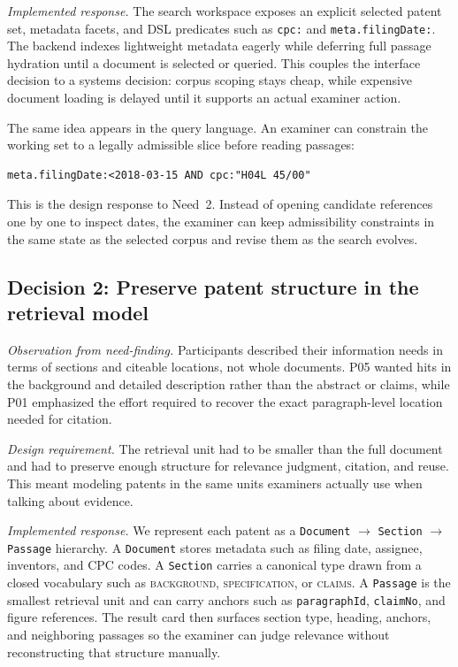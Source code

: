 \documentclass[sigconf]{acmart}
\newcommand{\DocSectionPassage}{\texttt{Document} $\to$ \texttt{Section} $\to$ \texttt{Passage}}
\begin{document}
\emph{Implemented response.} The search workspace exposes an explicit selected
patent set, metadata facets, and DSL predicates such as \texttt{cpc:} and
\texttt{meta.filingDate:}. The backend indexes lightweight metadata eagerly
while deferring full passage hydration until a document is selected or queried.
This couples the interface decision to a systems decision: corpus scoping stays
cheap, while expensive document loading is delayed until it supports an actual
examiner action.

The same idea appears in the query language. An examiner can constrain the
working set to a legally admissible slice before reading passages:

\begin{lstlisting}[caption={Constrain a scoped corpus by filing date and CPC.}]
meta.filingDate:<2018-03-15 AND cpc:"H04L 45/00"
\end{lstlisting}

This is the design response to Need~2. Instead of opening candidate references
one by one to inspect dates, the examiner can keep admissibility constraints in
the same state as the selected corpus and revise them as the search evolves.


\subsection{Decision 2: Preserve patent structure in the retrieval model}

\emph{Observation from need-finding.} Participants described their information
needs in terms of sections and citeable locations, not whole documents. P05
wanted hits in the background and detailed description rather than the abstract
or claims, while P01 emphasized the effort required to recover the exact
paragraph-level location needed for citation.

\emph{Design requirement.} The retrieval unit had to be smaller than the full
document and had to preserve enough structure for relevance judgment, citation,
and reuse. This meant modeling patents in the same units examiners actually use
when talking about evidence.

\emph{Implemented response.} We represent each patent as a
\DocSectionPassage{} hierarchy. A \texttt{Document}
stores metadata such as filing date, assignee, inventors, and CPC codes. A
\texttt{Section} carries a canonical type drawn from a closed vocabulary such
as \textsc{background}, \textsc{specification}, or \textsc{claims}. A
\texttt{Passage} is the smallest retrieval unit and can carry anchors such as
\texttt{paragraphId}, \texttt{claimNo}, and figure references. The result card
then surfaces section type, heading, anchors, and neighboring passages so the
examiner can judge relevance without reconstructing that structure manually.
\end{document}
